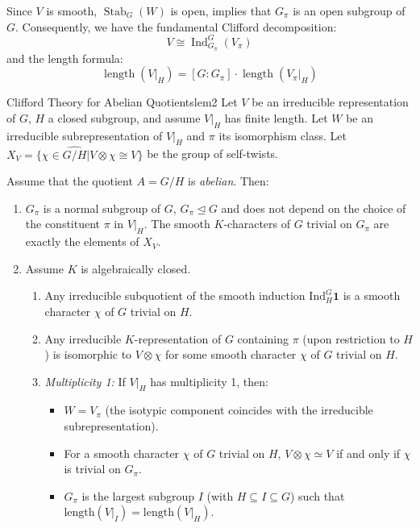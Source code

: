 \documentclass{article}
\newcommand{\nsubg}{\trianglelefteq}
\renewcommand{\mid}{\big|}
\begin{document}
Since $V$ is smooth, $\operatorname{Stab}_G(W)$ is open, implies that $G_\pi$ is an open subgroup of $G$.
Consequently, we have the fundamental Clifford decomposition:
\[
  V \cong \operatorname{Ind}_{G_\pi}^G(V_\pi)
\]
and the length formula:
\[
  \operatorname{length}(V|_H) = [G:G_\pi] \cdot \operatorname{length}(V_\pi|_H)
\]
\begin{lem}{Clifford Theory for Abelian Quotients}{lem2}
  Let $V$ be an irreducible representation of $G$, $H$ a closed subgroup, and assume $V|_H$ has finite length.
  Let $W$ be an irreducible subrepresentation of $V|_H$ and $\pi$ its isomorphism class.
  Let $X_V = \{ \chi \in \widehat{G/H} \mid V \otimes \chi \cong V \}$ be the group of self-twists.

  Assume that the quotient \(A = G/H\) is \emph{abelian}. Then:

  \begin{enumerate}
    \item \(G_{\pi}\) is a normal subgroup of \(G\), $G_\pi \nsubg G$ and does not depend on the choice of the constituent \(\pi\) in \(V|_{H}\).
    The smooth \(K\)-characters of \(G\) trivial on \(G_{\pi}\) are exactly the elements of \(X_V\).

    \item Assume \(K\) is algebraically closed.
    \begin{enumerate}
      \item Any irreducible subquotient of the smooth induction \(\mathrm{Ind}_H^G \mathbf{1}\) is a smooth character \(\chi\) of \(G\) trivial on \(H\).

      \item Any irreducible \(K\)-representation of \(G\) containing \(\pi\) (upon restriction to $H$) is isomorphic to \(V \otimes \chi\) for some smooth character \(\chi\) of \(G\) trivial on \(H\).

      \item \emph{Multiplicity 1:} If \(V|_H\) has multiplicity 1, then:
      \begin{itemize}
          \item \(W = V_{\pi}\) (the isotypic component coincides with the irreducible subrepresentation).
          \item For a smooth character \(\chi\) of \(G\) trivial on \(H\), \(V \otimes \chi \simeq V\) if and only if \(\chi\) is trivial on \(G_{\pi}\).
          \item \(G_{\pi}\) is the largest subgroup \(I\) (with $H \subseteq I \subseteq G$) such that \(\mathrm{length}(V|_I) = \mathrm{length}(V|_H)\).
      \end{itemize}


\end{enumerate}
\end{enumerate}
\end{lem}
\end{document}

